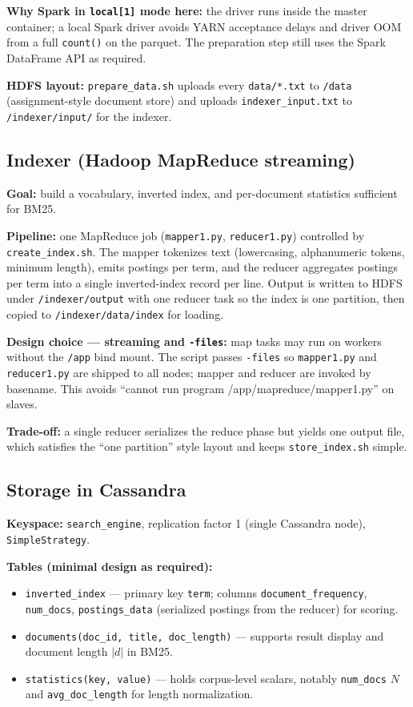 \documentclass[11pt,a4paper]{article}
\begin{document}
\textbf{Why Spark in \texttt{local[1]} mode here:} the driver runs inside the master container; a local Spark driver avoids YARN acceptance delays and driver OOM from a full \texttt{count()} on the parquet. The preparation step still uses the Spark DataFrame API as required.

\textbf{HDFS layout:} \texttt{prepare\_data.sh} uploads every \texttt{data/*.txt} to \texttt{/data} (assignment-style document store) and uploads \texttt{indexer\_input.txt} to \texttt{/indexer/input/} for the indexer.

\subsection{Indexer (Hadoop MapReduce streaming)}
\textbf{Goal:} build a vocabulary, inverted index, and per-document statistics sufficient for BM25.

\textbf{Pipeline:} one MapReduce job (\texttt{mapper1.py}, \texttt{reducer1.py}) controlled by \texttt{create\_index.sh}. The mapper tokenizes text (lowercasing, alphanumeric tokens, minimum length), emits postings per term, and the reducer aggregates postings per term into a single inverted-index record per line. Output is written to HDFS under \texttt{/indexer/output} with one reducer task so the index is one partition, then copied to \texttt{/indexer/data/index} for loading.

\textbf{Design choice --- streaming and \texttt{-files}:} map tasks may run on workers without the \texttt{/app} bind mount. The script passes \texttt{-files} so \texttt{mapper1.py} and \texttt{reducer1.py} are shipped to all nodes; mapper and reducer are invoked by basename. This avoids ``cannot run program /app/mapreduce/mapper1.py'' on slaves.

\textbf{Trade-off:} a single reducer serializes the reduce phase but yields one output file, which satisfies the ``one partition'' style layout and keeps \texttt{store\_index.sh} simple.

\subsection{Storage in Cassandra}
\textbf{Keyspace:} \texttt{search\_engine}, replication factor 1 (single Cassandra node), \texttt{SimpleStrategy}.

\textbf{Tables (minimal design as required):}
\begin{itemize}[leftmargin=*]
  \item \texttt{inverted\_index} --- primary key \texttt{term}; columns \texttt{document\_frequency}, \texttt{num\_docs}, \texttt{postings\_data} (serialized postings from the reducer) for scoring.
  \item \texttt{documents(doc\_id, title, doc\_length)} --- supports result display and document length $|d|$ in BM25.
  \item \texttt{statistics(key, value)} --- holds corpus-level scalars, notably \texttt{num\_docs} $N$ and \texttt{avg\_doc\_length} for length normalization.
\end{itemize}
\end{document}
